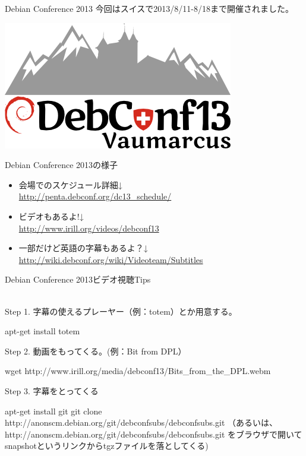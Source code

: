 \begin{frame}{Debian Conference 2013}
 今回はスイスで2013/8/11-8/18まで開催されました。

\begin{center}
\includegraphics[width=0.8\hsize]{image201310/DebConf13-logo.png}
\end{center}

\end{frame}

\begin{frame}{Debian Conference 2013の様子}

  \begin{itemize}
    \item 会場でのスケジュール詳細↓\\ 
       \url{http://penta.debconf.org/dc13_schedule/}
    \item ビデオもあるよ!↓\\
       \url{http://www.irill.org/videos/debconf13}
    \item 一部だけど英語の字幕もあるよ？↓\\
     \url{http://wiki.debconf.org/wiki/Videoteam/Subtitles}
  \end{itemize}
\end{frame}

\begin{frame}[containsverbatim]{Debian Conference 2013ビデオ視聴Tips}

 {\color{red}{ヒアリング苦手な人は英語の字幕つかってみよう！}}\\

 Step 1.  字幕の使えるプレーヤー（例：totem）とか用意する。
     \begin{commandlinesmall}
apt-get install totem
     \end{commandlinesmall}

 Step 2.  動画をもってくる。(例：Bit from DPL）
     \begin{commandlinesmall}
wget http://www.irill.org/media/debconf13/Bits_from_the_DPL.webm
     \end{commandlinesmall}
 Step 3. 字幕をとってくる
     \begin{commandlinesmall}
apt-get install git
git clone http://anonscm.debian.org/git/debconfsubs/debconfsubs.git
（あるいは、http://anonscm.debian.org/git/debconfsubs/debconfsubs.git
をブラウザで開いてsnapshotというリンクからtgzファイルを落としてくる)
     \end{commandlinesmall}

\end{frame}

